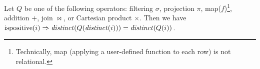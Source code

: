 \begin{comment}
\noindent
\begin{tabular}{m{3.5cm}m{.5cm}m{3.5cm}}
\begin{tikzpicture}[auto,>=latex]
  \node[] (input) {$i$};
  \node[block, right of=input, node distance=1.1cm] (distinct) {$\distinct$};
  \node[block, right of=distinct, node distance=1.2cm] (q) {$Q$};
  \node[right of=q] (output)  {$o$};
  \draw[->] (input) -- (distinct);
  \draw[->] (distinct) -- (q);
  \draw[->] (q) -- (output);
\end{tikzpicture}
&
$\cong$
&
\begin{tikzpicture}[auto,>=latex]
  \node[] (input) {$i$};
  \node[block, right of=input] (q) {$Q$};
  \node[block, right of=q, node distance=1.2cm] (distinct1) {$\distinct$};
  \node[right of=distinct1, node distance=1.2cm] (output)  {$o$};
  \draw[->] (input) -- (q);
  \draw[->] (q) -- (distinct1);
  \draw[->] (distinct1) -- (output);
\end{tikzpicture}
\end{tabular}

This rule allows us to delay the application of $\distinct$.
\end{comment}

\begin{proposition}\label{prop-distinct-once}
Let $Q$ be one of the following \zrs operators: filtering $\sigma$,
projection $\pi$, map($f$)\footnote{Technically, map (applying a user-defined
function to each row) is not relational.},
addition $+$, join $\bowtie$, or
Cartesian product $\times$.
Then we have $\mbox{ispositive}(i) \Rightarrow \mathit{distinct}(Q(\mathit{distinct}(i))) = \mathit{distinct}(Q(i))$.
\end{proposition}

\begin{comment}
\noindent
\begin{tabular}{m{6.5cm}m{.5cm}}
\begin{tikzpicture}[auto,>=latex]
  \node[] (input) {$i$};
  \node[block, right of=input, node distance=1.5cm] (distinct) {$\distinct$};
  \node[block, right of=distinct, node distance=1.5cm] (q) {$Q$};
  \node[block, right of=q, node distance=1.5cm] (distinct1) {$\distinct$};
  \node[right of=distinct1, node distance=1.5cm] (output)  {$o$};
  \draw[->] (input) -- (distinct);
  \draw[->] (distinct) -- (q);
  \draw[->] (q) -- (distinct1);
  \draw[->] (distinct1) -- (output);
\end{tikzpicture}
&
$\cong$ \\
\begin{tikzpicture}[auto,>=latex]
  \node[] (input) {$i$};
  \node[block, right of=input] (q) {$Q$};
  \node[block, right of=q, node distance=1.5cm] (distinct1) {$\distinct$};
  \node[right of=distinct1, node distance=1.5cm] (output)  {$o$};
  \draw[->] (input) -- (q);
  \draw[->] (q) -- (distinct1);
  \draw[->] (distinct1) -- (output);
\end{tikzpicture}
\end{tabular}
\end{comment}

